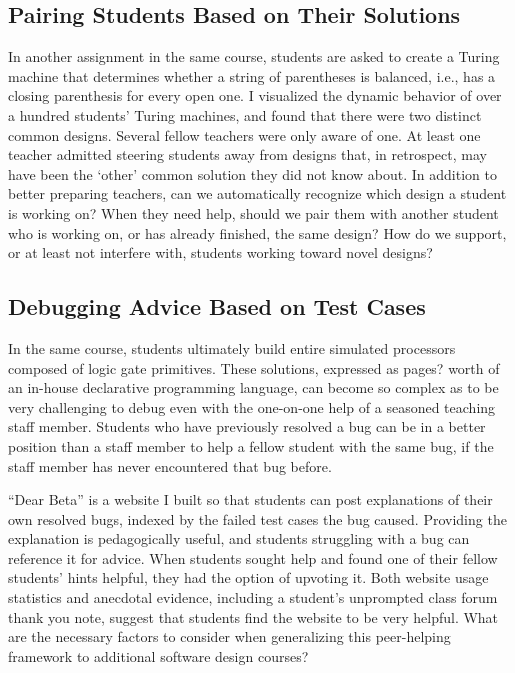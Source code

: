 \documentclass{sigchi}
\begin{document}
\subsection{Pairing Students Based on Their Solutions} In another assignment in the same course, students are asked to create a Turing machine that determines whether a string of parentheses is balanced, i.e., has a closing parenthesis for every open one. I visualized the dynamic behavior of over a hundred students' Turing machines, and found that there were two distinct common designs. Several fellow teachers were only aware of one. At least one teacher admitted steering students away from designs that, in retrospect, may have been the `other' common solution they did not know about. In addition to better preparing teachers, can we automatically recognize which design a student is working on? When they need help, should we pair them with another student who is working on, or has already finished, the same design? How do we support, or at least not interfere with, students working toward novel designs?

\subsection{Debugging Advice Based on Test Cases} In the same course, students ultimately build entire simulated processors composed of logic gate primitives. These solutions, expressed as pages? worth of an in-house declarative programming language, can become so complex as to be very challenging to debug even with the one-on-one help of a seasoned teaching staff member. Students who have previously resolved a bug can be in a better position than a staff member to help a fellow student with the same bug, if the staff member has never encountered that bug before. 

``Dear Beta'' is a website I built so that students can post explanations of their own resolved bugs, indexed by the failed test cases the bug caused. Providing the explanation is pedagogically useful, and students struggling with a bug can reference it for advice. When students sought help and found one of their fellow students' hints helpful, they had the option of upvoting it. Both website usage statistics and anecdotal evidence, including a student's unprompted class forum thank you note, suggest that students find the website to be very helpful. What are the necessary factors to consider when generalizing this peer-helping framework to additional software design courses?
\end{document}
